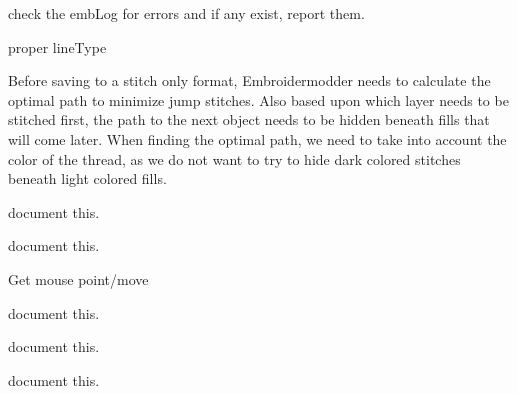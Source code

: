 \begin{DoxyRefList}
\label{todo__todo000212}%
%
check the emb\+Log for errors and if any exist, report them.  
\item[Member \mbox{\hyperlink{imgui__main_8c_a0b3de79e89680a179f356443a96a1d82}{save\+\_\+to\+Polyline}} (Emb\+Pattern $\ast$pattern, Emb\+Vector obj\+Pos, Emb\+Path obj\+Path, const char $\ast$layer, Emb\+Color color, const char $\ast$line\+Type, const char $\ast$line\+Weight)]\label{todo__todo000213}%
%
proper line\+Type  
\item[Member \mbox{\hyperlink{class_save_object_a15bdf578a20c1c1cb630dc8264448484}{Save\+Object\+::save}} (const QString \&file\+Name)]\label{todo__todo000223}%
%
Before saving to a stitch only format, Embroidermodder needs to calculate the optimal path to minimize jump stitches. Also based upon which layer needs to be stitched first, the path to the next object needs to be hidden beneath fills that will come later. When finding the optimal path, we need to take into account the color of the thread, as we do not want to try to hide dark colored stitches beneath light colored fills.  
\item[Member \mbox{\hyperlink{imgui__main_8c_a70fe2e75db13a87e2f7cacb84965d4f7}{scale\+\_\+main}} (void)]\label{todo__todo000219}%
%
document this.  
\item[Member \mbox{\hyperlink{imgui__main_8c_a576c69d904f6ab53782880507615c0bb}{scale\+\_\+redo}} (void)]\label{todo__todo000206}%
%
document this.  
\item[Member \mbox{\hyperlink{imgui__main_8c_ae74d7fe26f0b7ad748ec0ee058890b1d}{scale\+\_\+selected\+\_\+action}} (void)]\label{todo__todo000160}%
%
Get mouse point/move  
\item[Member \mbox{\hyperlink{imgui__main_8c_a1c5590236f2767623174b3582aedb1af}{scale\+\_\+undo}} (void)]\label{todo__todo000205}%
%
document this.  
\item[Member \mbox{\hyperlink{imgui__main_8c_aa6e7e1721e6086d501ac4780d78bec17}{scale\+Action}} (void)]\label{todo__todo000067}%
%
document this.  
\item[Member \mbox{\hyperlink{imgui__main_8c_ac3bbc377fe8f8778b8ddd912c64e6d5c}{selectbox\+\_\+\+Select\+Box}} (void)]\label{todo__todo000068}%
%
document this.  
\item[Member \mbox{\hyperlink{imgui__main_8c_a1c40925b7c59e6ac1db5c448a11dfa97}{selection\+\_\+changed}} (void)]\label{todo__todo000049}%

\end{DoxyRefList}
